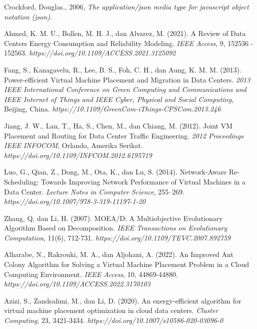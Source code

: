 \begin{thebibliography}{99}

	Crockford, Douglas., 2006, \textit{The application/json media type for javascript object notation (json)}.
	
	Ahmed, K. M. U., Bollen, M. H. J., dan Alvarez, M. (2021). A Review of Data Centers Energy Consumption and Reliability Modeling. \textit{IEEE Access}, 9, 152536 - 152563. \textit{https://doi.org/10.1109/ACCESS.2021.3125092}
	
	Fang, S., Kanagavelu, R., Lee, B. S., Foh, C. H., dan Aung, K. M. M. (2013). Power-efficient Virtual Machine Placement and Migration in Data Centers. \textit{2013 IEEE International Conference on Green Computing and Communications and IEEE Internet of Things and IEEE Cyber, Physical and Social Computing}, Beijing, China. \textit{https://10.1109/GreenCom-iThings-CPSCom.2013.246}
	
	Jiang, J. W., Lan, T., Ha, S., Chen, M., dan Chiang, M. (2012). Joint VM Placement and Routing for Data Center Traffic Engineering. \textit{2012 Proceedings IEEE INFOCOM}, Orlando, Amerika Serikat. \textit{https://doi.org/10.1109/INFCOM.2012.6195719}
	
	Luo, G., Qian, Z., Dong, M., Ota, K., dan Lu, S. (2014). Network-Aware Re-Scheduling: Towards Improving Network Performance of Virtual Machines in a Data Center. \textit{Lecture Notes in Computer Science}, 255–269. \textit{https://doi.org/10.1007/978-3-319-11197-1-20}
	
	Zhang, Q. dan Li, H. (2007). MOEA/D: A Multiobjective Evolutionary Algorithm Based on Decomposition. \textit{IEEE Transactions on Evolutionary Computation}, 11(6), 712-731. \textit{https://doi.org/10.1109/TEVC.2007.892759}
	
	Alharabe, N., Rakrouki, M. A., dan Aljohani, A. (2022). An Improved Ant Colony Algorithm for Solving a Virtual Machine Placement Problem in a Cloud Computing Environment. \textit{IEEE Access}, 10, 44869-44880. \textit{https://doi.org/10.1109/ACCESS.2022.3170103}
	
	Azizi, S., Zandsalimi, M., dan Li, D. (2020). An energy-efficient algorithm for virtual machine placement optimization in cloud data centers. \textit{Cluster Computing}, 23, 3421-3434. \textit{https://doi.org/10.1007/s10586-020-03096-0}
	

\end{thebibliography}
